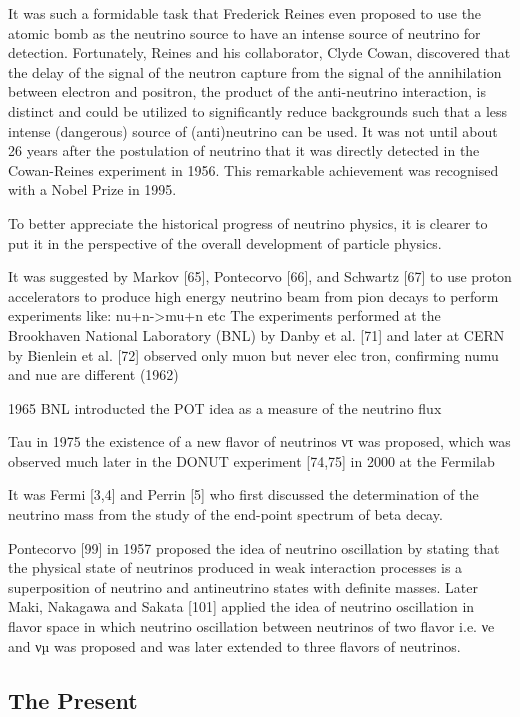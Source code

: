 It was such a formidable task that Frederick Reines even proposed to use the atomic bomb  as the neutrino source to have an intense source of neutrino for detection.
Fortunately, Reines and his collaborator, Clyde Cowan, discovered that the delay of the signal of the neutron capture from the signal of the annihilation between electron and positron, the product of the anti-neutrino interaction, is distinct and could be utilized to significantly reduce backgrounds such that a less intense (dangerous) source of (anti)neutrino can be used.
It was not until about 26 years after the postulation of neutrino that it was directly detected in the Cowan-Reines experiment in 1956. 
This remarkable achievement was recognised with a Nobel Prize in 1995.

To better appreciate the historical progress of neutrino physics, it is clearer to put it in the perspective of the overall development of particle physics.

It was suggested by Markov [65], Pontecorvo [66], and Schwartz [67] to use proton accelerators to produce high energy
neutrino beam from pion decays to perform experiments like:
nu+n->mu+n
etc
The experiments performed at the Brookhaven National Laboratory (BNL) by Danby et al. [71] and later at
CERN by Bienlein et al. [72] 
observed only muon but never elec tron, confirming numu and nue are different (1962)

1965 BNL introducted the POT idea as a measure of the neutrino flux

Tau in 1975
the existence of a new flavor of
neutrinos ντ was proposed, which was observed much later in the DONUT experiment [74,75] in 2000 at the Fermilab

It was Fermi [3,4] and Perrin [5] who first discussed the determination of the neutrino mass from the study of the
end-point spectrum of beta decay.

Pontecorvo [99] in 1957 proposed the idea of neutrino oscillation by stating that the physical state of neutrinos
produced in weak interaction processes is a superposition of neutrino and antineutrino states with definite masses.
Later Maki, Nakagawa and Sakata [101] applied the idea of neutrino
oscillation in flavor space in which neutrino oscillation between neutrinos of two flavor i.e. νe and νµ was proposed
and was later extended to three flavors of neutrinos.


\subsection{The Present}
